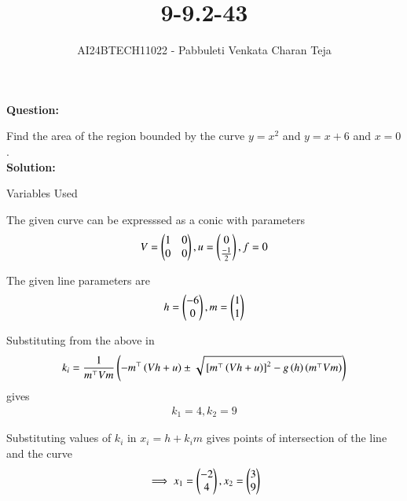 \documentclass[journal]{IEEEtran}
\begin{document}

\vspace{3cm}

\title{9-9.2-43}
\author{AI24BTECH11022 - Pabbuleti Venkata Charan Teja}
\maketitle

\renewcommand{\thefigure}{\theenumi}
\renewcommand{\thetable}{\theenumi}

\textbf{Question:}

Find the area of the region bounded by the curve $y=x^{2}$ and $y=x+6$ and $x=0$.\\

\textbf{Solution:}

\begin{table}[h!]
\renewcommand{\thetable}{1}
    \centering
   
   \def\tablename{Table}
   \caption{Variables Used}
    \label{tab9.9.2.43.1}
\end{table}

The given curve can be expresssed as a conic with parameters 
\begin{align}
    V=\begin{pmatrix}1 & 0\\ 0 & 0\\\end{pmatrix},u=\begin{pmatrix}0 \\ \frac{-1}{2}\\\end{pmatrix},f=0
\end{align}


The given line parameters are 
\begin{align}
    h=\begin{pmatrix}-6 \\ 0\\\end{pmatrix},m=\begin{pmatrix}1 \\ 1\\\end{pmatrix}
\end{align}


Substituting from the above in $$k_{i}=\frac{1}{m^{\top}Vm}\left(-m^{\top}\left(Vh+u\right)\pm\sqrt{{}\left[m^{\top}\left(Vh+u\right)\right]^{2}-g\left(h\right)\left(m^{\top}Vm\right)}\right)$$ gives 
\begin{align}
    k_{1}=4,k_{2}=9
\end{align}

Substituting values of $k_{i}$ in $x_{i}=h+k_{i}m$ gives points of intersection of the line and the curve 
\begin{align}
    \implies x_{1}=\begin{pmatrix}-2 \\ 4\\\end{pmatrix},x_{2}=\begin{pmatrix}3\\ 9\\\end{pmatrix}
\end{align}
\end{document}
